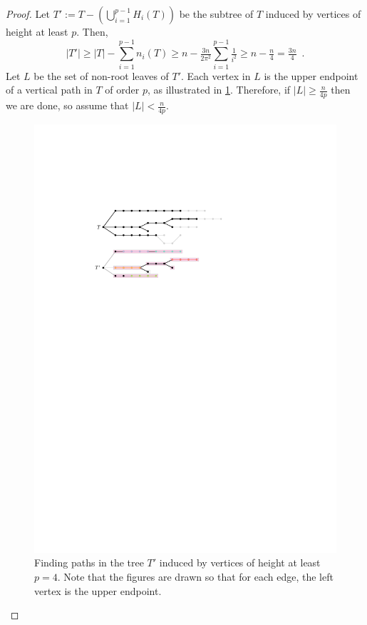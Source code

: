 \documentclass{patmorin}
\renewcommand{\ge}{\geqslant}
\theoremstyle{plain}
\theoremstyle{definition}
\begin{document}
\begin{proof}
  Let $T':=T-(\bigcup_{i=1}^{p-1} H_i(T))$ be the subtree of $T$ induced by vertices of height at least $p$.  Then,
  \[
    |T'|\ge |T| - \sum_{i=1}^{p-1} n_i(T)
    \ge n - \tfrac{3n}{2\pi^2}\sum_{i=1}^{p-1} \tfrac{1}{i^2}
    \ge  n - \tfrac{n}{4} = \tfrac{3n}{4} \enspace .
  \]
 Let $L$ be the set of non-root leaves of $T'$.  Each vertex in $L$ is the upper endpoint of a vertical path in $T$ of order $p$, as illustrated in \cref{disjoint_p_paths_figs}.  Therefore, if $|L|\ge \tfrac{n}{4p}$ then we are done, so assume that $|L|<\tfrac{n}{4p}$.  

  \begin{figure}
    \begin{center}
      \includegraphics{figs/disjoint-paths}
    \end{center}
    \caption{Finding paths in the tree $T'$ induced by vertices of height at least $p=4$. Note that the figures are drawn so that for each edge, the left vertex is the upper endpoint.} 
    \label{disjoint_p_paths_figs}
  \end{figure}


\end{proof}
\end{document}

